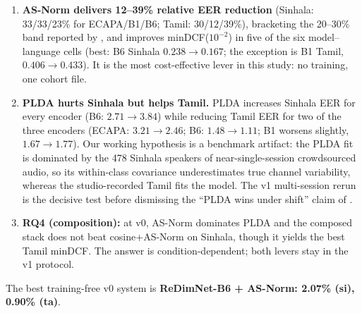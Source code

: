 \begin{enumerate}
\item \textbf{AS-Norm delivers 12--39\% relative EER reduction}
(Sinhala: 33/33/23\% for ECAPA/B1/B6; Tamil: 30/12/39\%), bracketing
the 20--30\% band reported by \cite{matejka2017analysis}, and
improves minDCF($10^{-2}$) in five of the six model--language cells
(best: B6 Sinhala $0.238\!\rightarrow\!0.167$; the exception is B1
Tamil, $0.406\!\rightarrow\!0.433$). It is the most cost-effective
lever in this study: no training, one cohort file.
\item \textbf{PLDA hurts Sinhala but helps Tamil.} PLDA increases
Sinhala EER for every encoder (B6: $2.71\!\rightarrow\!3.84$) while
reducing Tamil EER for two of the three encoders (ECAPA:
$3.21\!\rightarrow\!2.46$; B6: $1.48\!\rightarrow\!1.11$; B1 worsens
slightly, $1.67\!\rightarrow\!1.77$). Our working hypothesis is a benchmark
artifact: the PLDA fit is dominated by the 478 Sinhala speakers of
near-single-session crowdsourced audio, so its within-class
covariance underestimates true channel variability, whereas the
studio-recorded Tamil fits the model. The v1 multi-session rerun is
the decisive test before dismissing the ``PLDA wins under shift''
claim of \cite{wang2022plda}.
\item \textbf{RQ4 (composition):} at v0, AS-Norm dominates PLDA and
the composed stack does not beat cosine{+}AS-Norm on Sinhala, though
it yields the best Tamil minDCF. The answer is
condition-dependent; both levers stay in the v1 protocol.
\end{enumerate}

The best training-free v0 system is
\textbf{ReDimNet-B6 + AS-Norm: 2.07\% (si), 0.90\% (ta)}.

